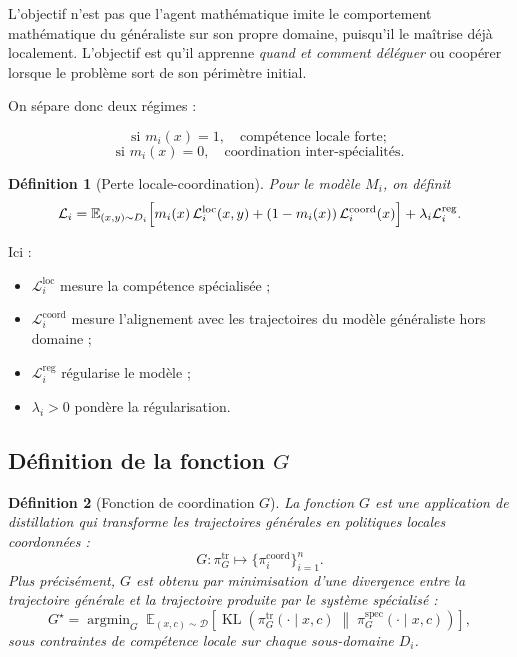 \documentclass[11pt,a4paper]{article}
\newtheorem{definition}{Définition}[section]
\DeclareMathOperator{\argmin}{argmin}
\DeclareMathOperator{\KL}{KL}
\newcommand{\1}{\mathbf 1}
\begin{document}
L'objectif n'est pas que l'agent mathématique imite le comportement mathématique du généraliste sur son propre domaine, puisqu'il le maîtrise déjà localement.
L'objectif est qu'il apprenne \emph{quand et comment déléguer} ou coopérer lorsque le problème sort de son périmètre initial.

On sépare donc deux régimes :

\[
\text{si } m_i(x)=1,\quad \text{compétence locale forte};
\]
\[
\text{si } m_i(x)=0,\quad \text{coordination inter-spécialités}.
\]

\begin{definition}[Perte locale-coordination]
Pour le modèle \(M_i\), on définit
\[
\mathcal L_i
=
\mathbb E_{(x,y)\sim D_i}
\Bigl[
m_i(x)\,\mathcal L_i^{\mathrm{loc}}(x,y)
+
(1-m_i(x))\,\mathcal L_i^{\mathrm{coord}}(x)
\Bigr]
+
\lambda_i \mathcal L_i^{\mathrm{reg}}.
\]
\end{definition}

Ici :
\begin{itemize}[leftmargin=2em]
    \item \(\mathcal L_i^{\mathrm{loc}}\) mesure la compétence spécialisée ;
    \item \(\mathcal L_i^{\mathrm{coord}}\) mesure l'alignement avec les trajectoires du modèle généraliste hors domaine ;
    \item \(\mathcal L_i^{\mathrm{reg}}\) régularise le modèle ;
    \item \(\lambda_i>0\) pondère la régularisation.
\end{itemize}

\subsection{Définition de la fonction \(G\)}

\begin{definition}[Fonction de coordination \(G\)]
La fonction \(G\) est une application de distillation qui transforme les trajectoires générales en politiques locales coordonnées :
\[
G:\pi_G^{\mathrm{tr}}\longmapsto \{\pi_i^{\mathrm{coord}}\}_{i=1}^n.
\]
Plus précisément, \(G\) est obtenu par minimisation d'une divergence entre la trajectoire générale et la trajectoire produite par le système spécialisé :
\[
G^\star
=
\argmin_{G}
\;
\mathbb E_{(x,c)\sim \mathcal D}
\left[
\KL\!\left(
\pi_G^{\mathrm{tr}}(\cdot\mid x,c)
\;\middle\|\;
\pi_{G}^{\mathrm{spec}}(\cdot\mid x,c)
\right)
\right],
\]
sous contraintes de compétence locale sur chaque sous-domaine \(D_i\).
\end{definition}
\end{document}
